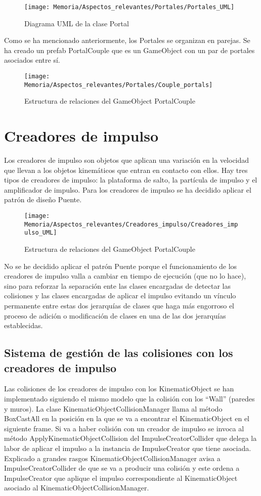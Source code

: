 \begin{figure}[h]
\centering
\texttt{[image: Memoria/Aspectos\_relevantes/Portales/Portales\_UML]}
\caption{Diagrama UML de la clase Portal}
\end{figure}

Como se ha mencionado anteriormente, los Portales se organizan en parejas. Se ha creado un prefab PortalCouple que es un GameObject con un par de portales asociados entre sí.

\begin{figure}[h]
\centering
\texttt{[image: Memoria/Aspectos\_relevantes/Portales/Couple\_portals]}
\caption{Estructura de relaciones del GameObject PortalCouple}
\end{figure}

\section{Creadores de impulso}

Los creadores de impulso son objetos que aplican una variación en la velocidad que llevan a los objetos kinemáticos que entran en contacto con ellos. Hay tres tipos de creadores de impulso: la plataforma de salto, la partícula de impulso y el amplificador de impulso.
Para los creadores de impulso se ha decidido aplicar el patrón de diseño Puente.
\clearpage

\begin{figure}[h]
\texttt{[image: Memoria/Aspectos\_relevantes/Creadores\_impulso/Creadores\_impulso\_UML]}
\caption{Estructura de relaciones del GameObject PortalCouple}
\end{figure}

No se he decidido aplicar el patrón Puente porque el funcionamiento de los creadores de impulso valla a cambiar en tiempo de ejecución (que no lo hace), sino para reforzar la separación ente las clases encargadas de detectar las colisiones y las clases encargadas de aplicar el impulso evitando un vínculo permanente entre estas dos jerarquías de clases que haga más engorroso el proceso de adición o modificación de clases en una de las dos jerarquías establecidas.

\subsection{Sistema de gestión de las colisiones con los creadores de impulso}
Las colisiones de los creadores de impulso con los KinematicObject se han implementado siguiendo el mismo modelo que la colisión con los “Wall” (paredes y muros). La clase KinematicObjectCollisionManager llama al método BoxCastAll en la posición en la que se va a encontrar el KinematicObject en el siguiente frame. Si va a haber colisión con un creador de impulso se invoca al método ApplyKinematicObjectCollision del ImpulseCreatorCollider que delega la labor de aplicar el impulso a la instancia de ImpulseCreator que tiene asociada.\\
Explicado a grandes rasgos KinematicObjectCollisionManager avisa a ImpulseCreatorCollider de que se va a producir una colisión y este ordena a ImpulseCreator que aplique el impulso correspondiente al KinematicObject asociado al KinematicObjectCollisionManager.

